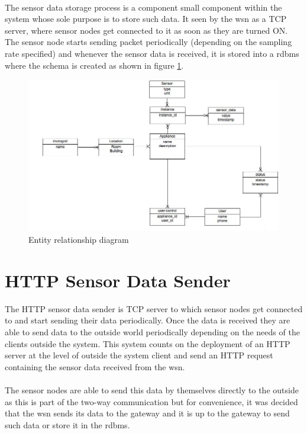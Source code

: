 \documentclass[oneside,12pt,a4paper,final]{book}
\begin{document}
\paragraph{}
The sensor data storage process is a component small component within the system whose sole purpose is to store such data. It seen by the \gls{wsn} as a TCP server, where sensor nodes get connected to it as soon as they are turned ON. The sensor node starts sending packet periodically (depending on the sampling rate specified) and whenever the sensor data is received, it is stored into a \gls{rdbms} where the schema is created as shown in figure \ref{fig:erd}.

\begin{figure}[htbp]
\centering
\includegraphics[scale=0.5]{img/smart_grid_db.jpg}
\caption{Entity relationship diagram}
\label{fig:erd}
\end{figure}

\section{HTTP Sensor Data Sender} 
The HTTP sensor data sender is TCP server to which sensor nodes get connected to and start sending their data periodically. Once the data is received they are able to send data to the outside world periodically depending on the needs of the clients outside the system. This system counts on the deployment of an HTTP server at the level of outside the system client and send an HTTP request containing the sensor data received from the \gls{wsn}. 
\paragraph{}
The sensor nodes are able to send this data by themselves directly to the outside as this is part of the two-way communication but for convenience, it was decided that the \gls{wsn} sends its data to the gateway and it is up to the gateway to send such data or store it in the \gls{rdbms}.
\end{document}

